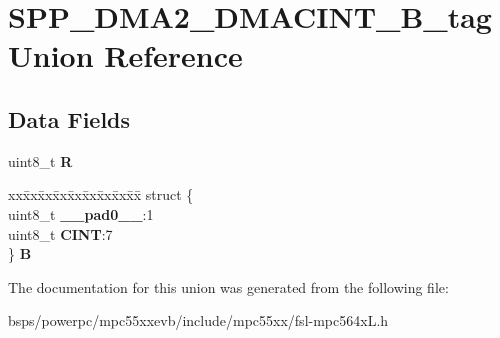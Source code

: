 \hypertarget{unionSPP__DMA2__DMACINT__8B__tag}{}\section{S\+P\+P\+\_\+\+D\+M\+A2\+\_\+\+D\+M\+A\+C\+I\+N\+T\+\_\+B\+\_\+tag Union Reference}
\label{unionSPP__DMA2__DMACINT__8B__tag}
\subsection*{Data Fields}
\begin{DoxyCompactItemize}
\item 
\mbox{\label{unionSPP__DMA2__DMACINT__8B__tag_a2c1d1b11104113e7d2b37987ef61fc8b}} 
uint8\+\_\+t {\bfseries R}
\item 
\mbox{\label{unionSPP__DMA2__DMACINT__8B__tag_aee72cbd58101ee93c7ac9f519d4a0651}} 
\begin{tabbing}
xx\=xx\=xx\=xx\=xx\=xx\=xx\=xx\=xx\=\kill
struct \{\\
\>uint8\_t {\bfseries \_\_pad0\_\_}:1\\
\>uint8\_t {\bfseries CINT}:7\\
\} {\bfseries B}\\

\end{tabbing}\end{DoxyCompactItemize}


The documentation for this union was generated from the following file\+:\begin{DoxyCompactItemize}
\item 
bsps/powerpc/mpc55xxevb/include/mpc55xx/fsl-\/mpc564x\+L.\+h\end{DoxyCompactItemize}
